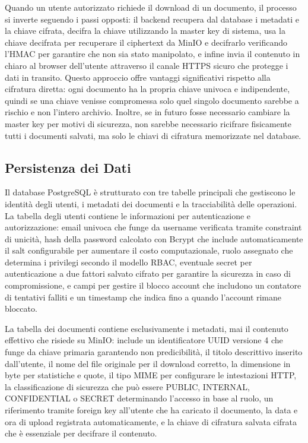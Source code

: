 \documentclass[12pt, a4paper]{article}
\begin{document}
Quando un utente autorizzato richiede il download di un documento, il processo si inverte seguendo i passi opposti: il backend recupera dal database i metadati e la chiave cifrata, decifra la chiave utilizzando la master key di sistema, usa la chiave decifrata per recuperare il ciphertext da MinIO e decifrarlo verificando l'HMAC per garantire che non sia stato manipolato, e infine invia il contenuto in chiaro al browser dell'utente attraverso il canale HTTPS sicuro che protegge i dati in transito. Questo approccio offre vantaggi significativi rispetto alla cifratura diretta: ogni documento ha la propria chiave univoca e indipendente, quindi se una chiave venisse compromessa solo quel singolo documento sarebbe a rischio e non l'intero archivio. Inoltre, se in futuro fosse necessario cambiare la master key per motivi di sicurezza, non sarebbe necessario ricifrare fisicamente tutti i documenti salvati, ma solo le chiavi di cifratura memorizzate nel database.

\subsection{Persistenza dei Dati}

Il database PostgreSQL è strutturato con tre tabelle principali che gestiscono le identità degli utenti, i metadati dei documenti e la tracciabilità delle operazioni. La tabella degli utenti contiene le informazioni per autenticazione e autorizzazione: email univoca che funge da username verificata tramite constraint di unicità, hash della password calcolato con Bcrypt che include automaticamente il salt configurabile per aumentare il costo computazionale, ruolo assegnato che determina i privilegi secondo il modello RBAC, eventuale secret per autenticazione a due fattori salvato cifrato per garantire la sicurezza in caso di compromissione, e campi per gestire il blocco account che includono un contatore di tentativi falliti e un timestamp che indica fino a quando l'account rimane bloccato.

La tabella dei documenti contiene esclusivamente i metadati, mai il contenuto effettivo che risiede su MinIO: include un identificatore UUID versione 4 che funge da chiave primaria garantendo non predicibilità, il titolo descrittivo inserito dall'utente, il nome del file originale per il download corretto, la dimensione in byte per statistiche e quote, il tipo MIME per configurare le intestazioni HTTP, la classificazione di sicurezza che può essere PUBLIC, INTERNAL, CONFIDENTIAL o SECRET determinando l'accesso in base al ruolo, un riferimento tramite foreign key all'utente che ha caricato il documento, la data e ora di upload registrata automaticamente, e la chiave di cifratura salvata cifrata che è essenziale per decifrare il contenuto.
\end{document}
